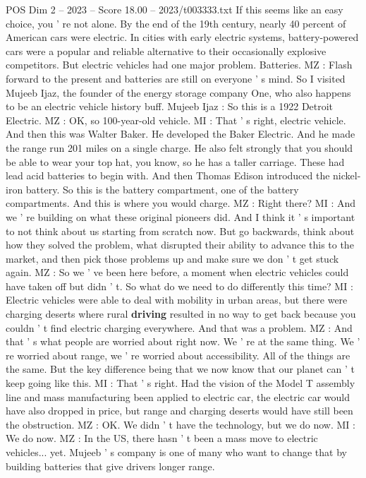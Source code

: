 \begin{textsample}{POS Dim 2 – 2023 – Score 18.00 – 2023/t003333.txt}
If this seems like an easy choice, you ' re not alone.
By the end of the 19th century, nearly 40 percent of American cars were electric.
In cities with early electric systems, battery-powered cars were a popular and reliable alternative to their occasionally explosive competitors.
But electric vehicles had one major problem.
Batteries.
MZ : Flash forward to the present and batteries are still on everyone ' s mind.
So I visited Mujeeb Ijaz, the founder of the energy storage company One, who also happens to be an electric vehicle history buff.
Mujeeb Ijaz : So this is a 1922 Detroit Electric.
MZ : OK, so 100-year-old vehicle.
MI : That ' s right, electric vehicle.
And then this was Walter Baker.
He developed the Baker Electric.
And he made the range run 201 miles on a single charge.
He also felt strongly that you should be able to wear your top hat, you know, so he has a taller carriage.
These had lead acid batteries to begin with.
And then Thomas Edison introduced the nickel-iron battery.
So this is the battery compartment, one of the battery compartments.
And this is where you would charge.
MZ : Right there?
MI : And we ' re building on what these original pioneers did.
And I think it ' s important to not think about us starting from scratch now.
But go backwards, think about how they solved the problem, what disrupted their ability to advance this to the market, and then pick those problems up and make sure we don ' t get stuck again.
MZ : So we ' ve been here before, a moment when electric vehicles could have taken off but didn ' t.
So what do we need to do differently this time?
MI : Electric vehicles were able to deal with mobility in urban areas, but there were charging deserts where rural \textbf{driving} resulted in no way to get back because you couldn ' t find electric charging everywhere.
And that was a problem.
MZ : And that ' s what people are worried about right now.
We ' re at the same thing.
We ' re worried about range, we ' re worried about accessibility.
All of the things are the same.
But the key difference being that we now know that our planet can ' t keep going like this.
MI : That ' s right.
Had the vision of the Model T assembly line and mass manufacturing been applied to electric car, the electric car would have also dropped in price, but range and charging deserts would have still been the obstruction.
MZ : OK.
We didn ' t have the technology, but we do now.
MI : We do now.
MZ : In the US, there hasn ' t been a mass move to electric vehicles... yet.
Mujeeb ' s company is one of many who want to change that by building batteries that give drivers longer range.

\end{textsample}
